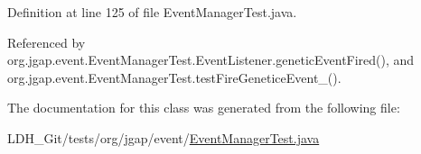 Definition at line 125 of file Event\-Manager\-Test.\-java.



Referenced by org.\-jgap.\-event.\-Event\-Manager\-Test.\-Event\-Listener.\-genetic\-Event\-Fired(), and org.\-jgap.\-event.\-Event\-Manager\-Test.\-test\-Fire\-Genetice\-Event\-\_().



The documentation for this class was generated from the following file\-:\begin{DoxyCompactItemize}
\item 
L\-D\-H\-\_\-\-Git/tests/org/jgap/event/\hyperlink{_event_manager_test_8java}{Event\-Manager\-Test.\-java}\end{DoxyCompactItemize}
